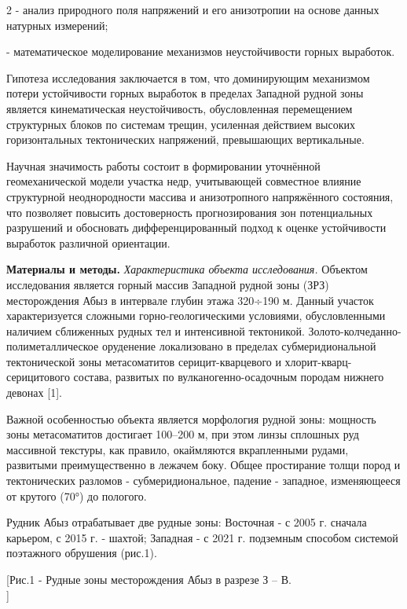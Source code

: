 \begin{multicols}{2}
- анализ природного поля напряжений и его анизотропии на основе данных
натурных измерений;

- математическое моделирование механизмов неустойчивости горных
выработок.

Гипотеза исследования заключается в том, что доминирующим механизмом
потери устойчивости горных выработок в пределах Западной рудной зоны
является кинематическая неустойчивость, обусловленная перемещением
структурных блоков по системам трещин, усиленная действием высоких
горизонтальных тектонических напряжений, превышающих вертикальные.

Научная значимость работы состоит в формировании уточнённой
геомеханической модели участка недр, учитывающей совместное влияние
структурной неоднородности массива и анизотропного напряжённого
состояния, что позволяет повысить достоверность прогнозирования зон
потенциальных разрушений и обосновать дифференцированный подход к оценке
устойчивости выработок различной ориентации.

{\bfseries Материалы и методы.} \emph{Характеристика объекта исследования.}
Объектом исследования является горный массив Западной рудной зоны (ЗРЗ)
месторождения Абыз в интервале глубин этажа 320÷190 м. Данный участок
характеризуется сложными горно-геологическими условиями, обусловленными
наличием сближенных рудных тел и интенсивной тектоникой.
Золото-колчеданно-полиметаллическое оруденение локализовано в пределах
субмеридиональной тектонической зоны метасоматитов серицит-кварцевого и
хлорит-кварц-серицитового состава, развитых по вулканогенно-осадочным
породам нижнего девонах {[}1{]}.

Важной особенностью объекта является морфология рудной зоны: мощность
зоны метасоматитов достигает 100--200 м, при этом линзы сплошных руд
массивной текстуры, как правило, окаймляются вкрапленными рудами,
развитыми преимущественно в лежачем боку. Общее простирание толщи пород
и тектонических разломов - субмеридиональное, падение - западное,
изменяющееся от крутого (70°) до пологого.

Рудник Абыз отрабатывает две рудные зоны: Восточная - с 2005 г. сначала
карьером, с 2015 г. - шахтой; Западная - с 2021 г. подземным способом
системой поэтажного обрушения (рис.1).
\end{multicols}

[Рис.1 - Рудные зоны месторождения Абыз в разрезе З --
В.\\]

